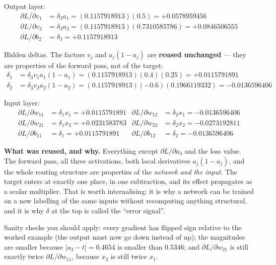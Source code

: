 \documentclass[11pt]{article}
\begin{document}
Output layer:
\begin{align*}
  \partial L/\partial v_1 &= \delta_3 a_1 = (0.1157918913)(0.5)
    = \mathbf{+0.0578959456}\\
  \partial L/\partial v_2 &= \delta_3 a_2 = (0.1157918913)(0.7310585786)
    = \mathbf{+0.0846506555}\\
  \partial L/\partial b_2 &= \delta_3 = \mathbf{+0.1157918913}
\end{align*}

Hidden deltas. The factors $v_j$ and $a_j(1-a_j)$ are \textbf{reused
unchanged} --- they are properties of the forward pass, not of the target:
\begin{align*}
  \delta_1 &= \delta_3 v_1 a_1(1-a_1) = (0.1157918913)(0.4)(0.25)
    = \mathbf{+0.0115791891}\\
  \delta_2 &= \delta_3 v_2 a_2(1-a_2)
    = (0.1157918913)(-0.6)(0.1966119332) = \mathbf{-0.0136596406}
\end{align*}

Input layer:
\begin{align*}
  \partial L/\partial w_{11} &= \delta_1 x_1 = \mathbf{+0.0115791891}
  & \partial L/\partial w_{12} &= \delta_2 x_1 = \mathbf{-0.0136596406}\\
  \partial L/\partial w_{21} &= \delta_1 x_2 = \mathbf{+0.0231583783}
  & \partial L/\partial w_{22} &= \delta_2 x_2 = \mathbf{-0.0273192811}\\
  \partial L/\partial b_{11} &= \delta_1 = \mathbf{+0.0115791891}
  & \partial L/\partial b_{12} &= \delta_2 = \mathbf{-0.0136596406}
\end{align*}

\textbf{What was reused, and why.} Everything except $\partial L/\partial a_3$
and the loss value. The forward pass, all three activations, both local
derivatives $a_j(1-a_j)$, and the whole routing structure are properties of
the \emph{network and the input}. The target enters at exactly one place, in
one subtraction, and its effect propagates as a scalar multiplier. That is
worth internalising: it is why a network can be trained on a new labelling of
the same inputs without recomputing anything structural, and it is why
$\delta$ at the top is called the ``error signal''.

Sanity checks you should apply: every gradient has flipped sign relative to
the worked example (the output must now go down instead of up); the magnitudes
are smaller because $|a_3 - t| = 0.4654$ is smaller than $0.5346$; and
$\partial L/\partial w_{21}$ is still exactly twice
$\partial L/\partial w_{11}$, because $x_2$ is still twice $x_1$.
\end{document}
